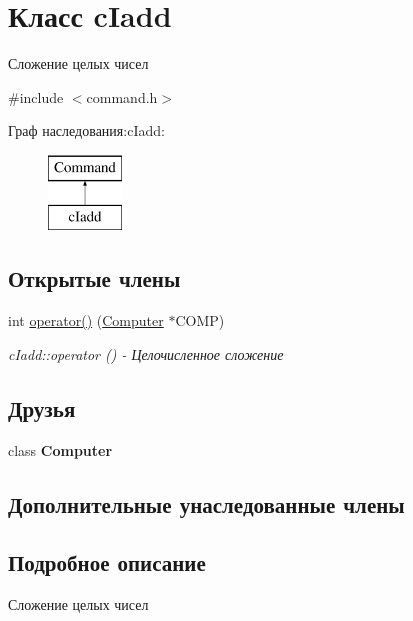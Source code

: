 \hypertarget{classc_iadd}{}\section{Класс c\+Iadd}
\label{classc_iadd}


Сложение целых чисел  




{\ttfamily \#include $<$command.\+h$>$}

Граф наследования\+:c\+Iadd\+:\begin{figure}[H]
\begin{center}
\leavevmode
\includegraphics[height=2.000000cm]{classc_iadd}
\end{center}
\end{figure}
\subsection*{Открытые члены}
\begin{DoxyCompactItemize}
\item 
int \hyperlink{classc_iadd_a05d46274b9bf1fd3f3d292210dcbd99c}{operator()} (\hyperlink{class_computer}{Computer} $\ast$C\+O\+MP)
\begin{DoxyCompactList}\small\item\em c\+Iadd\+::operator () -\/ Целочисленное сложение \end{DoxyCompactList}\end{DoxyCompactItemize}
\subsection*{Друзья}
\begin{DoxyCompactItemize}
\item 
\hypertarget{classc_iadd_ab9eca035c1f2a85f44c28a92b53d320c}{}\label{classc_iadd_ab9eca035c1f2a85f44c28a92b53d320c} 
class {\bfseries Computer}
\end{DoxyCompactItemize}
\subsection*{Дополнительные унаследованные члены}


\subsection{Подробное описание}
Сложение целых чисел 

